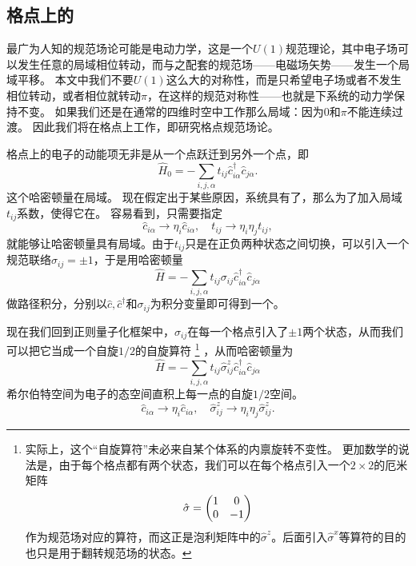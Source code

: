 \documentclass[hyperref, UTF8, a4paper]{ctexart}
\newcommand*{\concept}[1]{\underline{\textbf{#1}}}
\newcommand*{\Ztwo}{$\mathbb{Z}_2$}
\begin{document}
\subsection{格点上的}\label{sec:z2-on-lattice}

最广为人知的规范场论可能是电动力学，这是一个$U(1)$规范理论，其中电子场可以发生任意的局域相位转动，而与之配套的规范场——电磁场矢势——发生一个局域平移。
本文中我们不要$U(1)$这么大的对称性，而是只希望电子场或者不发生相位转动，或者相位就转动$\pi$，在这样的规范对称性——也就是\concept{}下系统的动力学保持不变。
如果我们还是在通常的四维时空中工作那么局域：因为$0$和$\pi$不能连续过渡。
因此我们将在格点上工作，即研究格点规范场论。

格点上的电子的动能项无非是从一个点跃迁到另外一个点，即
\begin{equation}
    \hat{H}_0 = - \sum_{i, j, \alpha} t_{ij} \hat{c}_{i \alpha}^\dagger \hat{c}_{j \alpha}.
    \label{eq:hopping-hamiltonian}
\end{equation}
这个哈密顿量在局域。
现在假定出于某些原因，系统具有了，那么为了加入局域$t_{ij}$系数，使得它在。
容易看到，只需要指定
\[
    \hat{c}_{i \alpha} \longrightarrow \eta_{i} \hat{c}_{i \alpha}, \quad t_{ij} \longrightarrow \eta_i \eta_j t_{ij},
\]
就能够让哈密顿量具有局域。由于$t_{ij}$只是在正负两种状态之间切换，可以引入一个规范联络$\sigma_{ij} = \pm 1$，于是用哈密顿量
\[
    \hat{H} = - \sum_{i, j, \alpha} t_{ij} \sigma_{ij} \hat{c}_{i \alpha}^\dagger \hat{c}_{j \alpha}
\]
做路径积分，分别以$\hat{c}, \hat{c}^\dagger$和$\sigma_{ij}$为积分变量即可得到一个。

现在我们回到正则量子化框架中，$\sigma_{ij}$在每一个格点引入了$\pm 1$两个状态，从而我们可以把它当成一个自旋$1/2$的自旋算符%
\footnote{实际上，这个“自旋算符”未必来自某个体系的内禀旋转不变性。
更加数学的说法是，由于每个格点都有两个状态，我们可以在每个格点引入一个$2\times 2$的厄米矩阵
\[
    \hat{\sigma} = \pmqty{1 & 0 \\ 0 & -1}
\]
作为规范场对应的算符，而这正是泡利矩阵中的$\hat{\sigma}^z$。后面引入$\hat{\sigma}^x$等算符的目的也只是用于翻转规范场的状态。
}%
，从而哈密顿量为
\begin{equation}
    \hat{H} = - \sum_{i, j, \alpha} t_{ij} \hat{\sigma}^z_{ij} \hat{c}_{i \alpha}^\dagger \hat{c}_{j \alpha}
    \label{eq:minimal-z2-couple}
\end{equation}
希尔伯特空间为电子的态空间直积上每一点的自旋$1/2$空间。
\begin{equation}
    \hat{c}_{i \alpha} \longrightarrow \eta_{i} \hat{c}_{i \alpha}, \quad \hat{\sigma}_{ij}^z \longrightarrow \eta_i \eta_j \hat{\sigma}_{ij}^z.
\end{equation}
\end{document}
